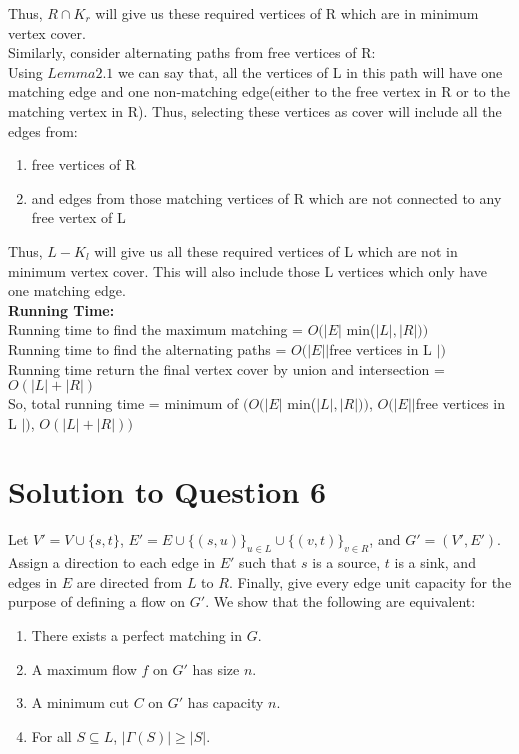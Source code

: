 \documentclass[11pt]{article}
\begin{document}
Thus, $R \cap K_r$ will give us these required vertices of R which are in minimum vertex cover. \\
Similarly, consider alternating paths from free vertices of R: \\
Using $Lemma 2.1$ we can say that, all the vertices of L in this path will have one matching edge and one non-matching edge(either to 
the free vertex in R or to the matching vertex in R). Thus, selecting these vertices as cover will include all the edges from: \\
\begin{enumerate}
	\item free vertices of R
	\item and edges from those matching vertices of R which are not connected to any free vertex of L
\end{enumerate}
Thus, $L - K_l$ will give us all these required vertices of L which are not in minimum vertex cover. This  will also include those L 
vertices which only have one matching edge. \\
\textbf{Running Time:} \\
Running time to find the maximum matching = $O(|E|$ min($|L|, |R|))$ \\
Running time to find the alternating paths = $O(|E| |$free vertices in L $|)$ \\
Running time return the final vertex cover by union and intersection = $O(|L|+|R|)$ \\
So, total running time = minimum of $(O(|E|$ min($|L|, |R|))$, $O(|E| |$free vertices in L $|)$, $O(|L|+|R|))$

\newpage
\section{Solution to Question 6}

Let $V' = V \cup \{s, t\}$, $E' = E \cup \{(s, u)\}_{u \in L} \cup \{(v, t)\}_{v \in R}$, and $G' = {(V', E')}$.
Assign a direction to each edge in $E'$ such that $s$ is a source, $t$ is a sink, and edges in $E$ are directed from $L$ to $R$.
Finally, give every edge unit capacity for the purpose of defining a flow on $G'$.
We show that the following are equivalent:

\begin{enumerate}
  \item There exists a perfect matching in $G$.
  \item A maximum flow $f$ on $G'$ has size $n$.
  \item A minimum cut $C$ on $G'$ has capacity $n$.
  \item For all $S \subseteq L$, $|\Gamma(S)| \geq |S|$.
\end{enumerate}
\end{document}
